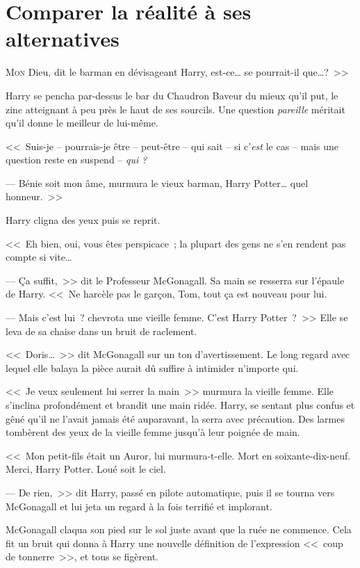 \chapter{Comparer la réalité à ses alternatives}

\lettrine[ante=<<~]{M}{on} Dieu, dit le barman en dévisageant Harry, est-ce… se pourrait-il que…?~>>

Harry se pencha par-dessus le bar du Chaudron Baveur du mieux qu'il put, le zinc atteignant à peu près le haut de ses sourcils. Une question \emph{pareille} méritait qu'il donne le meilleur de lui-même.

<<~Suis-je -- pourrais-je être -- peut-être -- qui sait -- si c'\emph{est} le cas -- mais une question reste en suspend -- \emph{qui} \emph{?}

--- Bénie soit mon âme, murmura le vieux barman, Harry Potter… quel honneur.~>>

Harry cligna des yeux puis se reprit.

<<~Eh bien, oui, vous êtes perspicace~; la plupart des gens ne s'en rendent pas compte si vite…

--- Ça suffit,~>> dit le Professeur McGonagall. Sa main se resserra sur l'épaule de Harry. <<~Ne harcèle pas le garçon, Tom, tout ça est nouveau pour lui.

--- Mais c'est lui~? chevrota une vieille femme. C'est Harry Potter~?~>> Elle se leva de sa chaise dans un bruit de raclement.

<<~Doris…~>> dit McGonagall sur un ton d'avertissement. Le long regard avec lequel elle balaya la pièce aurait dû suffire à intimider n'importe qui.

<<~Je veux seulement lui serrer la main~>> murmura la vieille femme. Elle s'inclina profondément et brandit une main ridée. Harry, se sentant plus confus et gêné qu'il ne l'avait jamais été auparavant, la serra avec précaution. Des larmes tombèrent des yeux de la vieille femme jusqu'à leur poignée de main.

<<~Mon petit-fils était un Auror, lui murmura-t-elle. Mort en soixante-dix-neuf. Merci, Harry Potter. Loué soit le ciel.

--- De rien,~>> dit Harry, passé en pilote automatique, puis il se tourna vers McGonagall et lui jeta un regard à la fois terrifié et implorant.

McGonagall claqua son pied sur le sol juste avant que la ruée ne commence. Cela fit un bruit qui donna à Harry une nouvelle définition de l'expression <<~coup de tonnerre~>>, et tous se figèrent.

